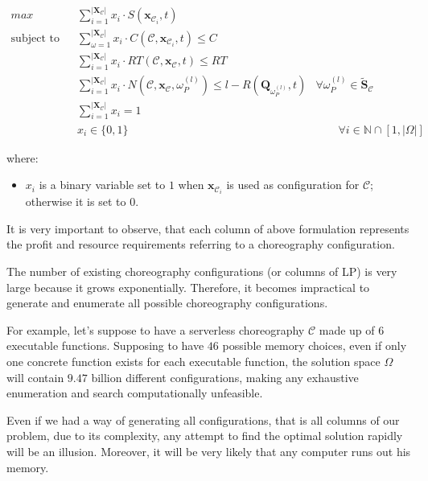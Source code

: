 \documentclass[12pt,a4paper]{report}
\newcommand{\N}{\mathbb{N}}
\begin{document}
\begin{align}
\displaystyle max \qquad & \displaystyle \sum_{i = 1}^{|\textbf{X}_{\mathcal{C}}|} x_i \cdot S(\textbf{x}_{\mathcal{C}_i},t) \\
\text{subject to} \qquad & \displaystyle \sum_{\omega = 1}^{|\textbf{X}_{\mathcal{C}}|} x_i \cdot C(\mathcal{C},\textbf{x}_{\mathcal{C}_i}, t) \leq C \\
& \displaystyle \sum_{i = 1}^{|\textbf{X}_{\mathcal{C}}|} x_i \cdot RT(\mathcal{C},\textbf{x}_{\mathcal{C}}, t) \leq RT \\ 
& \displaystyle \sum_{i = 1}^{|\textbf{X}_{\mathcal{C}}|} x_i \cdot N(\mathcal{C},\textbf{x}_{\mathcal{C}}, \omega_{P}^{(l)}) \leq l - R(\textbf{Q}_{\omega_{P}^{(l)}}, t) &  \forall \omega_{P}^{(l)} \in \widetilde{\textbf{S}}_{\mathcal{C}} \\
& \displaystyle \sum_{i = 1}^{|\textbf{X}_{\mathcal{C}}|} x_i = 1 & \\
& x_i \in \lbrace 0, 1 \rbrace & \qquad \forall i \in \N \cap [1,|\Omega|]
\end{align}

where:

\begin{itemize}
	\item $x_i$ is a binary variable set to $1$ when  $\textbf{x}_{\mathcal{C}_i}$ is used as configuration for $\mathcal{C}$; otherwise it is set to $0$.
\end{itemize}

It is very important to observe, that each column of above formulation represents the profit and resource requirements referring to a choreography configuration.

The number of existing choreography configurations (or columns of LP) is very large because it grows exponentially. Therefore, it becomes impractical to generate and enumerate all possible choreography configurations.

For example, let's suppose to have a serverless choreography $\mathcal{C}$ made up of $6$ executable functions. Supposing to have $46$ possible memory choices, even if only one concrete function exists for each executable function, the solution space $\Omega$ will contain $9.47$ billion different configurations, making any exhaustive enumeration and search computationally unfeasible. 

Even if we had a way of generating all configurations, that is all columns of our problem, due to its complexity, any attempt to find the optimal solution rapidly will be an illusion. Moreover, it will be very likely that any computer runs out his memory.
\end{document}
